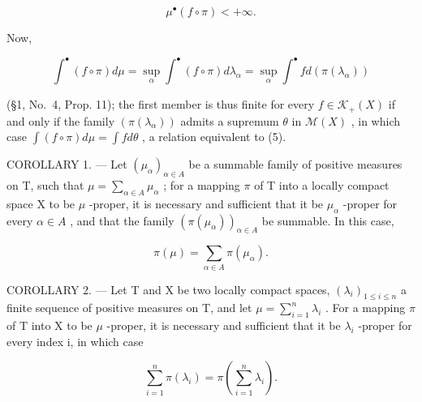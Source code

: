 \[
\mu^ {\bullet} (f \circ \pi) <   + \infty .
\]

Now,

\[
\int^ {\bullet} (f \circ \pi) d \mu = \sup _ {\alpha} \int^ {\bullet} (f \circ \pi) d \lambda_ {\alpha} = \sup _ {\alpha} \int^ {\bullet} f d (\pi (\lambda_ {\alpha}))
\]

(§1, No.~4, Prop. 11); the first member is thus finite for every \(f \in \mathcal{K}_{+}(X)\) if and only if the family \((\pi(\lambda_{\alpha}))\) admits a supremum \(\theta\) in \(\mathcal{M}(X)\) , in which case \(\int(f \circ \pi) d\mu = \int f d\theta\) , a relation equivalent to (5).

COROLLARY 1. --- Let \((\mu_{\alpha})_{\alpha \in A}\) be a summable family of positive measures on T, such that \(\mu = \sum_{\alpha \in A} \mu_{\alpha}\) ; for a mapping \(\pi\) of T into a locally compact space X to be \(\mu\) -proper, it is necessary and sufficient that it be \(\mu_{\alpha}\) -proper for every \(\alpha \in A\) , and that the family \((\pi(\mu_{\alpha}))_{\alpha \in A}\) be summable. In this case,

\[
\pi (\mu) = \sum_ {\alpha \in A} \pi (\mu_ {\alpha}).\tag{6}
\]

COROLLARY 2. --- Let T and X be two locally compact spaces, \((\lambda_{i})_{1\leqslant i\leqslant n}\) a finite sequence of positive measures on T, and let \(\mu=\sum_{i=1}^{n}\lambda_{i}\) . For a mapping \(\pi\) of T into X to be \(\mu\) -proper, it is necessary and sufficient that it be \(\lambda_{i}\) -proper for every index i, in which case

\[
\sum_ {i = 1} ^ {n} \pi (\lambda_ {i}) = \pi \left(\sum_ {i = 1} ^ {n} \lambda_ {i}\right).
\]

